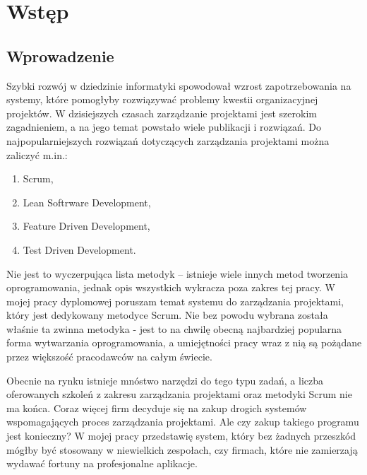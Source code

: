 \chapter{Wstęp}
\section{Wprowadzenie}

Szybki rozwój w dziedzinie informatyki spowodował wzrost zapotrzebowania na systemy, które pomogłyby rozwiązywać problemy kwestii organizacyjnej projektów. W dzisiejszych czasach zarządzanie projektami jest szerokim zagadnieniem, a na jego temat powstało wiele publikacji i rozwiązań. Do najpopularniejszych rozwiązań dotyczących zarządzania projektami można zaliczyć m.in.:
\begin{enumerate}
	\item Scrum,
	\item Lean Softrware Development,
	\item Feature Driven Development,
	\item Test Driven Development.
\end{enumerate}

Nie jest to wyczerpująca lista metodyk -- istnieje wiele innych metod tworzenia oprogramowania, jednak opis wszystkich wykracza poza zakres tej pracy. W mojej pracy dyplomowej poruszam temat systemu do zarządzania projektami, który jest dedykowany metodyce Scrum. Nie bez powodu wybrana została właśnie ta zwinna metodyka - jest to na chwilę obecną najbardziej popularna forma wytwarzania oprogramowania, a umiejętności pracy wraz z nią są pożądane przez większość pracodawców na całym świecie.

Obecnie na rynku istnieje mnóstwo narzędzi do tego typu zadań, a liczba oferowanych szkoleń z zakresu zarządzania projektami oraz metodyki Scrum nie ma końca. Coraz więcej firm decyduje się na zakup drogich systemów wspomagających proces zarządzania projektami. Ale czy zakup takiego programu jest konieczny? W mojej pracy przedstawię system, który bez żadnych przeszkód mógłby być stosowany w niewielkich zespołach, czy firmach, które nie zamierzają wydawać fortuny na profesjonalne aplikacje.

